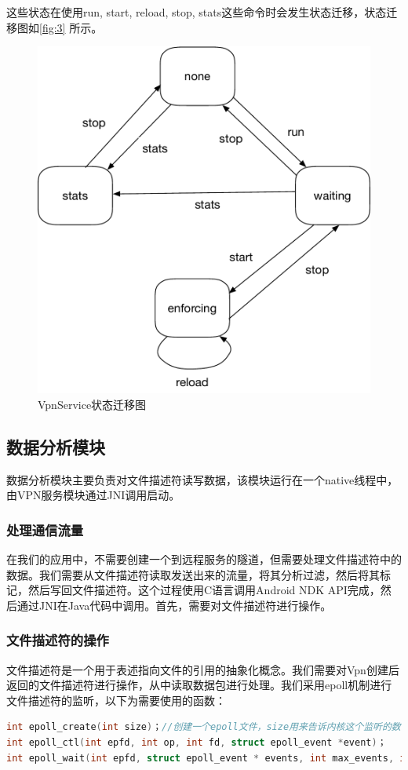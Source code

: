 \documentclass[format=final, language=chinese, degree=fyp]{hustthesis}
\begin{document}
这些状态在使用run, start, reload, stop, stats这些命令时会发生状态迁移，状态迁移图如\autoref{fig:3} 所示。

\begin{figure}[h!]
\centering
\includegraphics[width=.6\textwidth]{state_machine}
\caption{VpnService状态迁移图}\label{fig:3}
\end{figure}


\subsection{数据分析模块}
数据分析模块主要负责对文件描述符读写数据，该模块运行在一个native线程中，由VPN服务模块通过JNI调用启动。



\subsubsection{处理通信流量}

在我们的应用中，不需要创建一个到远程服务的隧道，但需要处理文件描述符中的数据。我们需要从文件描述符读取发送出来的流量，将其分析过滤，然后将其标记，然后写回文件描述符。这个过程使用C语言调用Android NDK API完成，然后通过JNI在Java代码中调用。首先，需要对文件描述符进行操作。

\subsubsection{文件描述符的操作}

文件描述符是一个用于表述指向文件的引用的抽象化概念。我们需要对Vpn创建后返回的文件描述符进行操作，从中读取数据包进行处理。我们采用epoll机制进行文件描述符的监听，以下为需要使用的函数：

\begin{lstlisting}[language=c]
int epoll_create(int size)；//创建一个epoll文件，size用来告诉内核这个监听的数目一共有多大
int epoll_ctl(int epfd, int op, int fd, struct epoll_event *event)；
int epoll_wait(int epfd, struct epoll_event * events, int max_events, int timeout);
\end{lstlisting}
\end{document}
